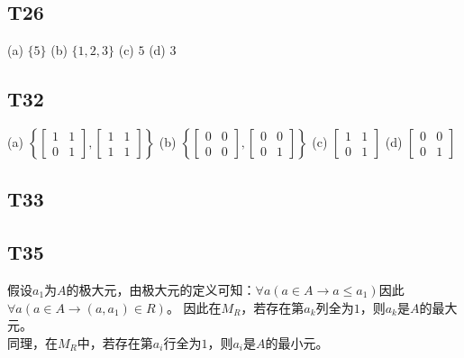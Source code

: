\documentclass{article}
\begin{document}
\subsection{T26}
(a) $\{5\}$ \quad (b) $\{1, 2, 3\}$ \quad (c) $5$ \quad (d) $3$
\subsection{T32}
(a) $\left\{
    \begin{bmatrix}
        1 & 1\\
        0 & 1
    \end{bmatrix},
    \begin{bmatrix}
        1 & 1\\
        1 & 1
    \end{bmatrix}
\right\}$\quad
(b) $\left\{
    \begin{bmatrix}
        0 & 0\\
        0 & 0
    \end{bmatrix},
    \begin{bmatrix}
        0 & 0\\
        0 & 1
    \end{bmatrix}
\right\}$\quad
(c) $\begin{bmatrix}
    1 & 1\\
    0 & 1
\end{bmatrix}$\quad
(d) $\begin{bmatrix}
    0 & 0\\
    0 & 1
\end{bmatrix}$
\subsection{T33}
\subsection{T35}
假设$a_1$为$A$的极大元，由极大元的定义可知：$\forall a(a \in A \rightarrow a \leq a_1)$因此$\forall a(a \in A \rightarrow (a, a_1) \in R)$。
因此在$M_R$，若存在第$a_k$列全为$1$，则$a_k$是$A$的最大元。\\
同理，在$M_R$中，若存在第$a_i$行全为$1$，则$a_i$是$A$的最小元。
\end{document}
